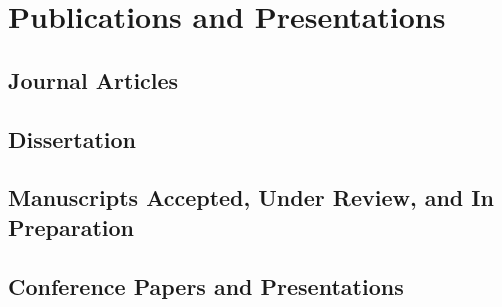 \section{Publications and Presentations}

\newrefsection\nocite{*}
\subsection{Journal Articles}
\printbibliography[heading=none,type=article]

\newrefsection
\subsection{Dissertation}
\nocite{doss-gollin_dissertation:2020}
\printbibliography[heading=none]

\newrefsection\nocite{*}
\subsection{Manuscripts Accepted, Under Review, and In Preparation}
\printbibliography[heading=none,type=unpublished]

\newrefsection\nocite{*}
\subsection{Conference Papers and Presentations}
\printbibliography[heading=none, type=inproceedings]


